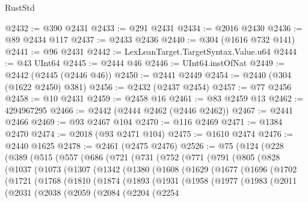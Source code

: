 \begin{lexlean}{RustStd}
\begin{coremodule}
@2432 := @390 @2431
@2433 := @291 @2431
@2434 := @2016 @2430
@2436 := @89 @2434 @117
@2437 := @2433 @2436
@2440 := @304 (@1616 @732 @141)
@2441 := @96 @2431
@2442 := LexLeanTarget.TargetSyntax.Value.u64
@2444 := @43 UInt64
@2445 := @2444 @46
@2446 := UInt64.instOfNat
@2449 := @2442 (@2445 (@2446 @46))
@2450 := @2441 @2449
@2454 := @2440 (@304 (@1622 @2450) @381)
@2456 := @2432 (@2437 @2454)
@2457 := @77 @2456
@2458 := @10 @2431
@2459 := @2458 @16
@2461 := @83 @2459 @13
@2462 := 4294967295
@2466 := @2442 (@2444 @2462 (@2446 @2462))
@2467 := @2441 @2466
@2469 := @93 @2467 @104
@2470 := @116 @2469
@2471 := @1384 @2470
@2474 := @2018 (@93 @2471 @104)
@2475 := @1610 @2474
@2476 := @2440 @1625
@2478 := @2461 (@2475 @2476)
@2526 := @75
    (@124
      (@228
        (@389
          (@515
            (@557
              (@686
                (@721
                  (@731
                    (@752
                      (@771
                        (@791
                          (@805
                            (@828
                              (@1037
                                (@1073
                                  (@1307
                                    (@1342
                                      (@1380
                                        (@1608
                                          (@1629
                                            (@1677
                                              (@1696
                                                (@1702
                                                  (@1721
                                                    (@1768
                                                      (@1810
                                                        (@1874
                                                          (@1893
                                                            (@1931
                                                              (@1958
                                                                (@1977
                                                                  (@1983
                                                                    (@2011
                                                                      (@2031
                                                                        (@2038
                                                                          (@2059
                                                                            (@2084
                                                                              (@2204
                                                                                (@2254

\end{coremodule}
\end{lexlean}
